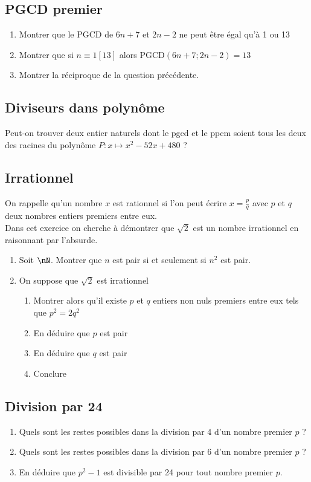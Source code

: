 \documentclass[oneside,12pt]{article}          %
\begin{document}
\subsection{PGCD premier}
\begin{enumerate}
    \item Montrer que le PGCD de $6n+7$ et $2n-2$ ne peut être égal qu'à 1 ou 13
    \item Montrer que si $n\equiv1[13]$ alors $\mathrm{PGCD}(6n+7;2n-2)=13$
	\item Montrer la réciproque de la question précédente.
\end{enumerate}



\subsection{Diviseurs dans polynôme}
Peut-on trouver deux entier naturels dont le pgcd et le ppcm soient tous les deux des racines du polynôme $P:x\mapsto x^2-52x+480$ ?



\subsection{Irrationnel}
On rappelle qu'un nombre $x$ est rationnel si l'on peut écrire $x=\frac{p}{q}$ avec $p$ et $q$ deux nombres entiers premiers entre eux.\\
Dans cet exercice on cherche à démontrer que $\sqrt{2}$ est un nombre irrationnel en raisonnant par l'absurde.

\begin{enumerate}
    \item Soit $\nN$. Montrer que $n$ est pair si et seulement si $n^2$ est pair.
    \item On suppose que $\sqrt{2}$ est irrationnel
    \begin{enumerate}
        \item Montrer alors qu'il existe $p$ et $q$ entiers non nuls premiers entre eux tels que $p^2=2q^2$
        \item En déduire que $p$ est pair
        \item En déduire que $q$ est pair
        \item Conclure
    \end{enumerate}
\end{enumerate}



\subsection{Division par 24}
\begin{enumerate}
    \item Quels sont les restes possibles dans la division par 4 d'un nombre premier $p$ ?
    \item Quels sont les restes possibles dans la division par 6 d'un nombre premier $p$ ?
    \item En déduire que $p^2-1$ est divisible par 24 pour tout nombre premier $p$.
\end{enumerate}
\end{document}
